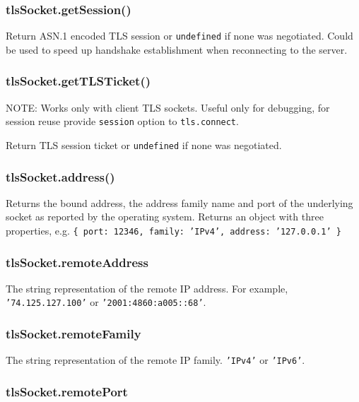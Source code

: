 \subsubsection{tlsSocket.getSession()}\label{tlssocket.getsession}

Return ASN.1 encoded TLS session or \texttt{undefined} if none was
negotiated. Could be used to speed up handshake establishment when
reconnecting to the server.

\subsubsection{tlsSocket.getTLSTicket()}\label{tlssocket.gettlsticket}

NOTE: Works only with client TLS sockets. Useful only for debugging, for
session reuse provide \texttt{session} option to \texttt{tls.connect}.

Return TLS session ticket or \texttt{undefined} if none was negotiated.

\subsubsection{tlsSocket.address()}\label{tlssocket.address}

Returns the bound address, the address family name and port of the
underlying socket as reported by the operating system. Returns an object
with three properties, e.g.
\texttt{\{ port: 12346, family: 'IPv4', address: '127.0.0.1' \}}

\subsubsection{tlsSocket.remoteAddress}\label{tlssocket.remoteaddress}

The string representation of the remote IP address. For example,
\texttt{'74.125.127.100'} or \texttt{'2001:4860:a005::68'}.

\subsubsection{tlsSocket.remoteFamily}\label{tlssocket.remotefamily}

The string representation of the remote IP family. \texttt{'IPv4'} or
\texttt{'IPv6'}.

\subsubsection{tlsSocket.remotePort}\label{tlssocket.remoteport}


